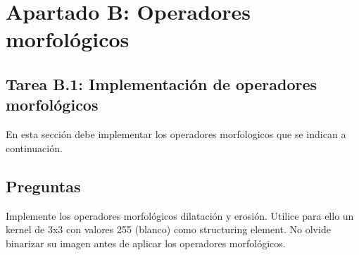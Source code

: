 \chapter{Apartado B: \textbf{Operadores morfológicos}}
\label{chapter:tarea_b}

\section*{Tarea B.1: Implementación de operadores morfológicos}
{}

En esta sección debe implementar los operadores morfologicos que se indican a continuación.

\section*{Preguntas}

\vspace{5mm}
\begin{tcolorbox}[colback=gray!10, colframe=gray!30, coltitle=black, title=Pregunta B.1, halign=left]
Implemente los operadores morfológicos dilatación y erosión. Utilice para ello un kernel de 3x3 con valores 255 (blanco) como structuring element. No olvide binarizar su imagen antes de aplicar los operadores morfológicos.
\end{tcolorbox}